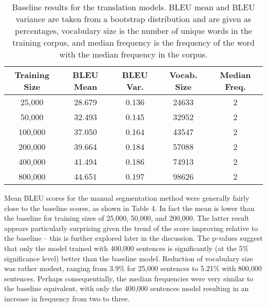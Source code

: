 \documentclass[11pt]{article}
\begin{document}
\begin{table}[h]
\centering
\begin{tabular}{|c|c|c|c|c|}
\hline
Training Size & BLEU Mean & BLEU Var. & Vocab. Size & Median Freq. \\ \hline
25,000             & 28.679    & 0.136         & 24633           & 2                     \\
50,000             & 32.493    & 0.145         & 32952           & 2                     \\
100,000            & 37.050    & 0.164         & 43547           & 2                     \\
200,000            & 39.664    & 0.184         & 57088           & 2                     \\
400,000            & 41.494    & 0.186         & 74913           & 2                     \\
800,000            & 44.651    & 0.197         & 98626           & 2                     \\ \hline
\end{tabular}
\caption{Baseline results for the translation models. BLEU mean and BLEU variance are taken from a bootstrap distribution and are given as percentages, vocabulary size is the number of unique words in the training corpus, and median frequency is the frequency of the word with the median frequency in the corpus.}
\label{table:baseline}
\end{table}

\bigskip

Mean BLEU scores for the manual segmentation method were generally fairly close to the baseline scores, as shown in Table 4. In fact the mean is lower than the baseline for training sizes of 25,000, 50,000, and 200,000. The latter result appears particularly surprising given the trend of the score improving relative to the baseline -- this is further explored later in the discussion. The p-values suggest that only the model trained with 400,000 sentences is significantly (at the 5\% significance level) better than the baseline model. Reduction of vocabulary size was rather modest, ranging from 3.9\% for 25,000 sentences to 5.21\% with 800,000 sentences. Perhaps consequentially, the median frequencies were very similar to the baseline equivalent, with only the 400,000 sentences model resulting in an increase in frequency from two to three.

\bigskip
\end{document}
